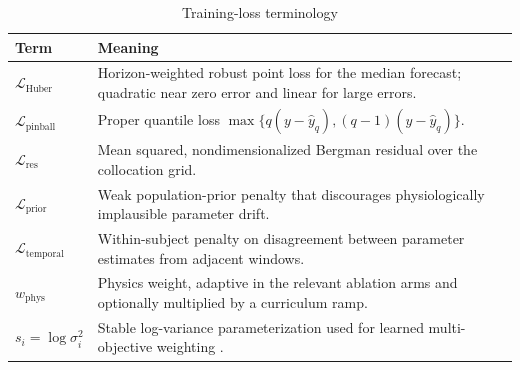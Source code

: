 \documentclass[journal]{IEEEtran}
\begin{document}
\begin{table}[t]
\centering
\caption{Training-loss terminology}
\label{tab:loss}
\footnotesize
\begin{tabular}{lp{13cm}}
\toprule
Term & Meaning \\
\midrule
$\mathcal{L}_{\text{Huber}}$ & Horizon-weighted robust point loss for the median forecast; quadratic near zero error and linear for large errors. \\
$\mathcal{L}_{\text{pinball}}$ & Proper quantile loss $\max\{q(y-\hat{y}_q), (q-1)(y-\hat{y}_q)\}$. \\
$\mathcal{L}_{\text{res}}$ & Mean squared, nondimensionalized Bergman residual over the collocation grid. \\
$\mathcal{L}_{\text{prior}}$ & Weak population-prior penalty that discourages physiologically implausible parameter drift. \\
$\mathcal{L}_{\text{temporal}}$ & Within-subject penalty on disagreement between parameter estimates from adjacent windows. \\
$w_{\text{phys}}$ & Physics weight, adaptive in the relevant ablation arms and optionally multiplied by a curriculum ramp. \\
$s_i = \log\sigma_i^2$ & Stable log-variance parameterization used for learned multi-objective weighting \cite{ref42}. \\
\bottomrule
\end{tabular}
\end{table}
\end{document}
